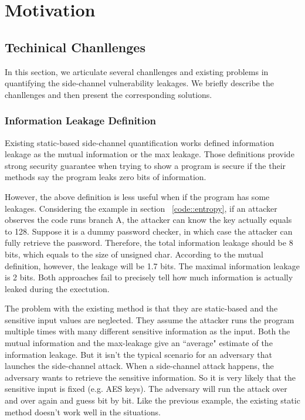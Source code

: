\section{Motivation}

\subsection{Techinical Chanllenges}
In this section, we articulate several chanllenges and existing problems
in quantifying the side-channel vulnerability leakages. We briefly describe the
chanllenges and then present the corresponding solutions.

\subsubsection{Information Leakage Definition}
Existing static-based side-channel quantification works defined information leakage
as the mutual information or the max leakage. Those definitions provide strong security guarantee
when trying to show a program is secure if the their methods say the program leaks zero bits of
information.

However, the above definition is less useful when if the program has some leakages. 
Considering the example in section ~\ref{code::entropy}, if an attacker observes the
code runs branch A, the attacker can know the key actually equals to 128. Suppose it is 
a dummy password checker, in which case the attacker can fully retrieve the password.
Therefore, the total information leakage should be 8 bits, which equals to the size
of unsigned char. 
According to the mutual definition, however, the leakage will be 1.7 bits. The maximal information
leakage is 2 bits. Both approaches fail to precisely tell how much information is actually leaked
during the exectution.

The problem with the existing method is that they are static-based and the sensitive
input values are neglected. They assume the attacker runs the program multiple times 
with many different sensitive information as the input. Both the mutual information 
and the max-leakage give an ``average" estimate of the information leakage. 
But it isn't the typical scenario for an adversary that launches the side-channel attack.
When a side-channel attack happens, the adversary wants to retrieve the sensitive
information. So it is very likely that the sensitive input is fixed (e.g. AES keys). 
The adversary will run the attack over and over again and guess bit by bit. Like the 
previous example, the existing static method doesn’t work well in the situations.


